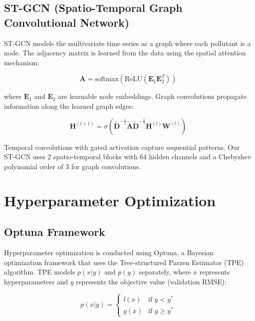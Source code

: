 \subsection{ST-GCN (Spatio-Temporal Graph Convolutional Network)}

ST-GCN models the multivariate time series as a graph where each pollutant is a node. The adjacency matrix is learned from the data using the spatial attention mechanism:

\begin{equation}
    \mathbf{A} = \text{softmax}(\text{ReLU}(\mathbf{E}_1 \mathbf{E}_2^T))
\end{equation}

where $\mathbf{E}_1$ and $\mathbf{E}_2$ are learnable node embeddings. Graph convolutions propagate information along the learned graph edges:

\begin{equation}
    \mathbf{H}^{(l+1)} = \sigma(\tilde{\mathbf{D}}^{-\frac{1}{2}} \tilde{\mathbf{A}} \tilde{\mathbf{D}}^{-\frac{1}{2}} \mathbf{H}^{(l)} \mathbf{W}^{(l)})
\end{equation}

Temporal convolutions with gated activation capture sequential patterns. Our ST-GCN uses 2 spatio-temporal blocks with 64 hidden channels and a Chebyshev polynomial order of 3 for graph convolutions.

\section{Hyperparameter Optimization}

\subsection{Optuna Framework}

Hyperparameter optimization is conducted using Optuna, a Bayesian optimization framework that uses the Tree-structured Parzen Estimator (TPE) algorithm. TPE models $p(x|y)$ and $p(y)$ separately, where $x$ represents hyperparameters and $y$ represents the objective value (validation RMSE):

\begin{equation}
    p(x|y) = \begin{cases}
        l(x) & \text{if } y < y^* \\
        g(x) & \text{if } y \geq y^*
    \end{cases}
\end{equation}

